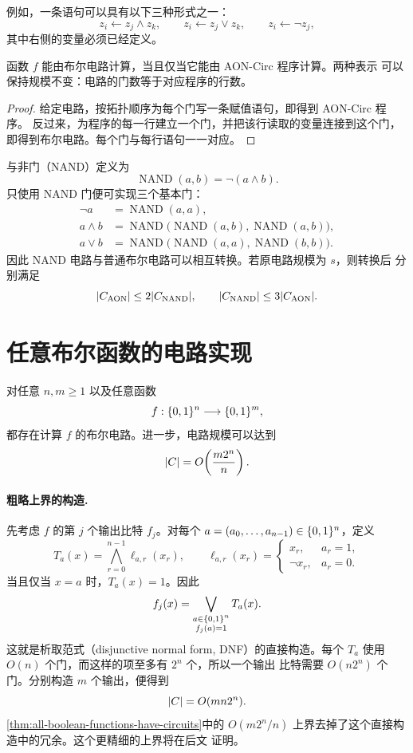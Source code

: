 例如，一条语句可以具有以下三种形式之一：
\[
  z_i\gets z_j\land z_k,
  \qquad
  z_i\gets z_j\lor z_k,
  \qquad
  z_i\gets\neg z_j,
\]
其中右侧的变量必须已经定义。

\begin{theorem}
  \label{thm:circuit-program-equivalence}
  函数 $f$ 能由布尔电路计算，当且仅当它能由 AON-Circ 程序计算。两种表示
  可以保持规模不变：电路的门数等于对应程序的行数。
\end{theorem}

\begin{proof}
  给定电路，按拓扑顺序为每个门写一条赋值语句，即得到 AON-Circ 程序。
  反过来，为程序的每一行建立一个门，并把该行读取的变量连接到这个门，
  即得到布尔电路。每个门与每行语句一一对应。
\end{proof}

与非门（NAND）定义为
\[
  \operatorname{NAND}(a,b)=\neg(a\land b).
\]
只使用 NAND 门便可实现三个基本门：
\begin{align*}
  \neg a
    &=\operatorname{NAND}(a,a),\\
  a\land b
    &=\operatorname{NAND}\bigl(
        \operatorname{NAND}(a,b),
        \operatorname{NAND}(a,b)
      \bigr),\\
  a\lor b
    &=\operatorname{NAND}\bigl(
        \operatorname{NAND}(a,a),
        \operatorname{NAND}(b,b)
      \bigr).
\end{align*}
因此 NAND 电路与普通布尔电路可以相互转换。若原电路规模为 $s$，则转换后
分别满足
\[
  \lvert C_{\mathrm{AON}}\rvert\leq 2\lvert C_{\mathrm{NAND}}\rvert,
  \qquad
  \lvert C_{\mathrm{NAND}}\rvert\leq 3\lvert C_{\mathrm{AON}}\rvert.
\]

\section{任意布尔函数的电路实现}

\begin{theorem}
  \label{thm:all-boolean-functions-have-circuits}
  对任意 $n,m\geq 1$ 以及任意函数
  \[
    f:\{0,1\}^n\longrightarrow\{0,1\}^m,
  \]
  都存在计算 $f$ 的布尔电路。进一步，电路规模可以达到
  \[
    \lvert C\rvert=O\!\left(\frac{m2^n}{n}\right).
  \]
\end{theorem}

\paragraph{粗略上界的构造.}
先考虑 $f$ 的第 $j$ 个输出比特 $f_j$。对每个
$a=(a_0,\ldots,a_{n-1})\in\{0,1\}^n$，定义
\[
  T_a(x)=\bigwedge_{r=0}^{n-1}\ell_{a,r}(x_r),
  \qquad
  \ell_{a,r}(x_r)=
  \begin{cases}
    x_r, & a_r=1,\\
    \neg x_r, & a_r=0.
  \end{cases}
\]
当且仅当 $x=a$ 时，$T_a(x)=1$。因此
\[
  f_j(x)=\bigvee_{\substack{a\in\{0,1\}^n\\f_j(a)=1}}T_a(x).
\]
这就是析取范式（disjunctive normal form, DNF）的直接构造。每个 $T_a$
使用 $O(n)$ 个门，而这样的项至多有 $2^n$ 个，所以一个输出
比特需要 $O(n2^n)$ 个门。分别构造 $m$ 个输出，便得到
\[
  \lvert C\rvert=O(mn2^n).
\]
\cref{thm:all-boolean-functions-have-circuits}中的
$O(m2^n/n)$ 上界去掉了这个直接构造中的冗余。这个更精细的上界将在后文
证明。

